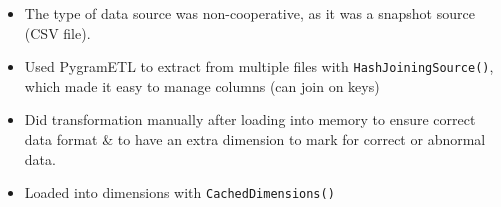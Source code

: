 \begin{multicols}{2}
\begin{itemize}
  \begin{itemize}
    \item
    The type of data source was non-cooperative, as it was a snapshot
    source (CSV file).
  \item
    Used PygramETL to extract from multiple files with
    \texttt{HashJoiningSource()}, which made it easy to manage columns
    (can join on keys)
  \item
    Did transformation manually after loading into memory to ensure
    correct data format \& to have an extra dimension to mark for
    correct or abnormal data.
  \item
    Loaded into dimensions with \texttt{CachedDimensions()}
  \end{itemize}
\end{itemize}
\end{multicols}